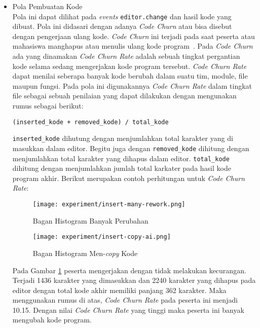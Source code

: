 \begin{itemize}
    \item Pola Pembuatan Kode \\
    Pola ini dapat dilihat pada \textit{events} \verb|editor.change| dan hasil kode yang dibuat. Pola ini didasari dengan adanya \textit{Code Churn} atau bisa disebut dengan pengerjaan ulang kode. \textit{Code Churn} ini terjadi pada saat peserta atau mahasiswa manghapus atau menulis ulang kode program~\cite{hatica:churn}. Pada \textit{Code Churn} ada yang dinamakan \textit{Code Churn Rate} adalah sebuah tingkat pergantian kode selama sedang mengerjakan kode program tersebut. \textit{Code Churn Rate} dapat menilai seberapa banyak kode berubah dalam suatu tim, module, file maupun fungsi. Pada pola ini digunakannya \textit{Code Churn Rate} dalam tingkat file sebagai sebuah penilaian yang dapat dilakukan dengan mengunakan rumus sebagai berikut:
    
    \begin{center}
        \verb|(inserted_kode + removed_kode) / total_kode|
    \end{center}

    \verb|inserted_kode| dihutung dengan menjumlahkan total karakter yang di masukkan dalam editor. Begitu juga dengan \verb|removed_kode| dihitung dengan menjumlahkan total karakter yang dihapus dalam editor. \verb|total_kode| dihitung dengan menjumlahkan jumlah total karkater pada hasil kode program akhir. Berikut merupakan contoh perhitungan untuk \textit{Code Churn Rate}:

    \begin{figure}[H]
        \centering
        \texttt{[image: experiment/insert-many-rework.png]}
        \caption{Bagan Histogram Banyak Perubahan}
        \label{fig:5:2:3:manyrework}
    \end{figure}

    \begin{figure}[H]
        \centering
        \texttt{[image: experiment/insert-copy-ai.png]}
        \caption{Bagan Histogram Men-\textit{copy} Kode}
        \label{fig:5:2:3:copy}
    \end{figure}

    Pada Gambar \ref{fig:5:2:3:manyrework} peserta mengerjakan dengan tidak melakukan kecurangan. Terjadi 1436 karakter yang dimasukkan dan 2240 karakter yang dihapus pada editor dengan total kode akhir memiliki panjang 362 karakter. Maka menggunakan rumus di atas, \textit{Code Churn Rate} pada peserta ini menjadi 10.15. Dengan nilai \textit{Code Churn Rate} yang tinggi maka peserta ini banyak mengubah kode program.
    

\end{itemize}
